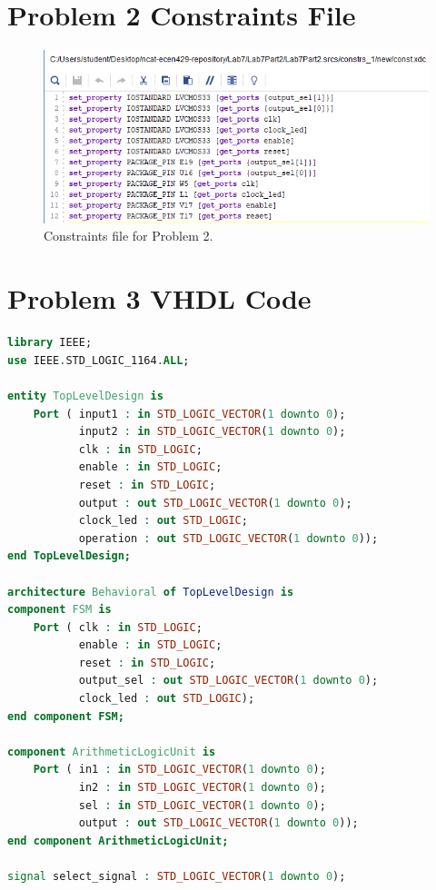 \documentclass[11pt]{article}
\begin{document}
\begin{appendices}
\section{Problem 2 Constraints File}
\begin{center}
\begin{figure}[H]
	\includegraphics[scale=1]{./images/Lab7Part2Const.png}
	\caption{\label{fig:Prob1Const}Constraints file for Problem 2.}
\end{figure}
\end{center}

\section{Problem 3 VHDL Code}
\begin{lstlisting}[language=VHDL]
library IEEE;
use IEEE.STD_LOGIC_1164.ALL;

entity TopLevelDesign is
    Port ( input1 : in STD_LOGIC_VECTOR(1 downto 0);
           input2 : in STD_LOGIC_VECTOR(1 downto 0);
           clk : in STD_LOGIC;
           enable : in STD_LOGIC;
           reset : in STD_LOGIC;
           output : out STD_LOGIC_VECTOR(1 downto 0);
           clock_led : out STD_LOGIC;
           operation : out STD_LOGIC_VECTOR(1 downto 0));
end TopLevelDesign;

architecture Behavioral of TopLevelDesign is
component FSM is
    Port ( clk : in STD_LOGIC;
           enable : in STD_LOGIC;
           reset : in STD_LOGIC;
           output_sel : out STD_LOGIC_VECTOR(1 downto 0);
           clock_led : out STD_LOGIC);
end component FSM;

component ArithmeticLogicUnit is
    Port ( in1 : in STD_LOGIC_VECTOR(1 downto 0);
           in2 : in STD_LOGIC_VECTOR(1 downto 0);
           sel : in STD_LOGIC_VECTOR(1 downto 0);
           output : out STD_LOGIC_VECTOR(1 downto 0));
end component ArithmeticLogicUnit;

signal select_signal : STD_LOGIC_VECTOR(1 downto 0);


\end{lstlisting}
\end{appendices}
\end{document}
